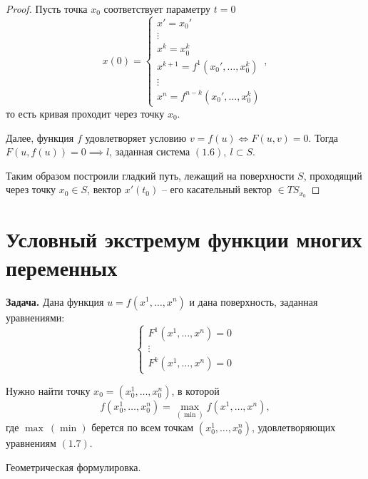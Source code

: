 \documentclass{report}
\theoremstyle{definition}
\begin{document}
\begin{proof}
  Пусть точка $x_0$ соответствует параметру $t = 0$
  \begin{equation*}
    x(0) = \left\{\begin{array}{l}
      x' = x_0'                        \\
      \vdots                           \\
      x^k = x_0^k                      \\
      x^{k+1} = f^1(x_0',\ldots,x_0^k) \\
      \vdots                           \\
      x^n = f^{n-k}(x_0', \ldots, x_0^k)
    \end{array}\right.,
  \end{equation*}
  то есть кривая проходит через точку $x_0$.

  Далее, функция $f$ удовлетворяет условию $v = f(u) \iff F(u,v) = 0$. Тогда $F(u,f(u)) = 0\implies l$, заданная система $(1.6), \ l \subset S$.

  Таким образом построили гладкий путь, лежащий на поверхности $S$, проходящий через точку $x_0 \in S$, вектор $x'(t_0)$ -- его касательный вектор $\in TS_{x_0}$
\end{proof}

\section{Условный экстремум функции многих переменных}

\textbf{Задача.} Дана функция $u = f(x^1,\ldots,x^n)$ и дана поверхность, заданная уравнениями:
\begin{equation}
  \left\{\begin{array}{l}
    F^1(x^1,\ldots,x^n) = 0 \\
    \vdots                  \\
    F^k(x^1,\ldots,x^n) = 0
  \end{array}\right.
\end{equation}

Нужно найти точку $x_0 = (x_0^1,\ldots,x_0^n)$, в которой
\begin{equation*}
  f(x_0^1,\ldots,x_0^n) = \underset{(\min)}{\max}f(x^1,\ldots,x^n),
\end{equation*}
где $\max \ (\min)$ берется по всем точкам $(x_0^1,\ldots,x_0^n)$, удовлетворяющих уравнениям $(1.7)$.

\begin{center}
  {\large Геометрическая формулировка.}
\end{center}
\end{document}
